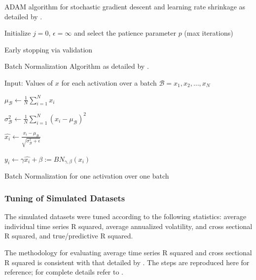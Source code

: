 \documentclass[a4paper, table]{article}
\begin{document}
ADAM algorithm for stochastic gradient descent and learning rate shrinkage as detailed by \cite{kingma_adam:_2014}.

\begin{algorithm}
	\SetAlgoLined
	Initialize $j = 0$, $\epsilon = \infty$ and select the patience parameter $p$ (max iterations)\
	
	\caption{Early stopping via validation}
\end{algorithm}

Batch Normalization Algorithm as detailed by \cite{ioffe_batch_2015}.

\begin{algorithm}
	Input: Values of \(x\) for each activation over a batch \(\mathcal{B} = {x_1, x_2, \dots, x_N}\)
	
	\(\mu_\mathcal{B} \leftarrow \frac{1}{N} \sum_{i = 1}^{N}x_i\)
	
	\(\sigma_\mathcal{B}^2 \leftarrow \frac{1}{N} \sum_{i = 1}^{N}(x_i - \mu_\mathcal{B})^2\)
	
	\(\hat{x_i} \leftarrow \frac{x_i - \mu_\mathcal{B}}{\sqrt{\sigma_\mathcal{B}^2 + \epsilon}}\)
	
	\(y_i \leftarrow \gamma\hat{x_i} + \beta := BN_{\gamma, \beta}(x_i)\)
	
	\caption{Batch Normalization for one activation over one batch}
\end{algorithm}

\subsubsection{Tuning of Simulated Datasets}

The simulated datasets were tuned according to the following statistics: average individual time series R squared, average annualized volatility, and cross sectional R squared, and true/predictive R squared.

The methodology for evaluating average time series R squared and cross sectional R squared is consistent with that detailed by \cite{cochrane_asset_2005}. The steps are reproduced here for reference; for complete details refer to \cite{cochrane_asset_2005}.
\end{document}

